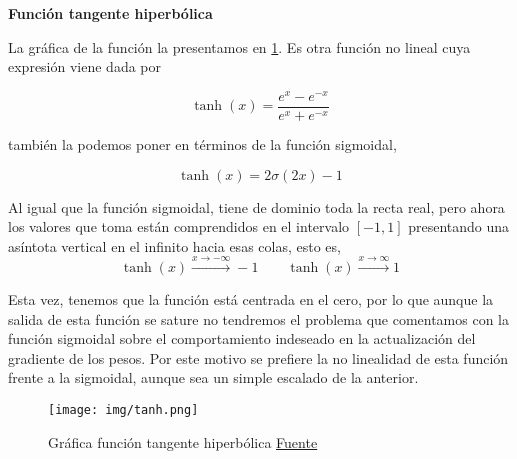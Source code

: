         
        
        
        
    \begin{center}
        \textbf{Función tangente hiperbólica} \\
    \end{center}
    
        La gráfica de la función la presentamos en \ref{fig:grafica tanh}. Es otra función no lineal cuya expresión viene dada por 
        
        \begin{equation}
            \tanh(x) = \frac{e^x - e^{-x}}{e^x + e^{-x}}
        \end{equation}
        
        \noindent también la podemos poner en términos de la función sigmoidal,
        
        \begin{equation}
            \tanh(x) = 2 \sigma(2x) - 1
        \end{equation}
        
        Al igual que la función sigmoidal, tiene de dominio toda la recta real, pero ahora los valores que toma están comprendidos en el intervalo $[-1,1]$ presentando una asíntota vertical en el infinito hacia esas colas, esto es,
        \begin{equation}
            \tanh(x) \overset{x \to -\infty}{\longrightarrow}  -1 \qquad  \tanh(x)\overset{x \to \infty}{\longrightarrow}  1
        \end{equation}
        
        \noindent Esta vez, tenemos que la función está centrada en el cero, por lo que aunque la salida de esta función se sature no tendremos el problema que comentamos con la función sigmoidal sobre el comportamiento indeseado en la actualización del gradiente de los pesos. Por este motivo se prefiere la no linealidad de esta función frente a la sigmoidal, aunque sea un simple escalado de la anterior. \\
    
        \begin{figure}[H]
            \centering
            \texttt{[image: img/tanh.png]}
            \caption{Gráfica función tangente hiperbólica \href{https://production-media.paperswithcode.com/methods/Screen_Shot_2020-05-27_at_4.23.22_PM_dcuMBJl.png}{Fuente}}
            \label{fig:grafica tanh}
        \end{figure}
        
